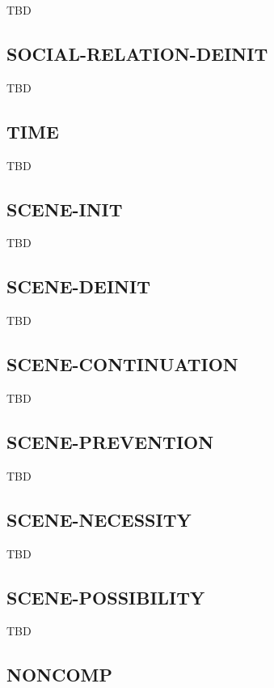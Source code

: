 \documentclass[a4paper]{article}
\newcommand{\fr}[1]{\textsf{#1}}
\begin{document}
TBD

\subsection{\fr{SOCIAL-RELATION-DEINIT}}
\label{sec:SOCIAL-RELATION-DEINIT}

TBD

\subsection{\fr{TIME}}
\label{sec:TIME}

TBD

\subsection{\fr{SCENE-INIT}}
\label{sec:SCENE-INIT}

TBD

\subsection{\fr{SCENE-DEINIT}}
\label{sec:SCENE-DEINIT}

TBD

\subsection{\fr{SCENE-CONTINUATION}}
\label{sec:SCENE-CONTINUATION}

TBD

\subsection{\fr{SCENE-PREVENTION}}
\label{sec:SCENE-PREVENTION}

TBD

\subsection{\fr{SCENE-NECESSITY}}
\label{sec:SCENE-NECESSITY}

TBD

\subsection{\fr{SCENE-POSSIBILITY}}
\label{sec:SCENE-POSSIBILITY}

TBD

\subsection{\fr{NONCOMP}}
\label{sec:NONCOMP}
\end{document}

